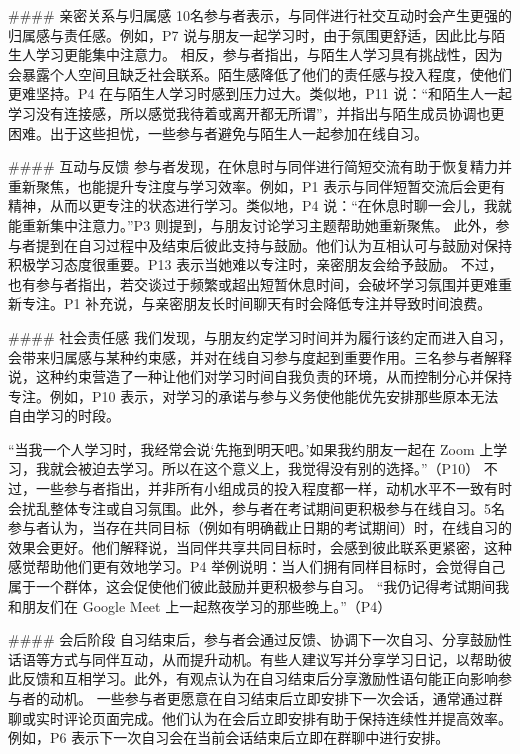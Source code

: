 \documentclass[12pt]{ctexart}
\begin{document}
\#\#\#\# 亲密关系与归属感
10名参与者表示，与同伴进行社交互动时会产生更强的归属感与责任感。例如，P7 说与朋友一起学习时，由于氛围更舒适，因此比与陌生人学习更能集中注意力。
相反，参与者指出，与陌生人学习具有挑战性，因为会暴露个人空间且缺乏社会联系。陌生感降低了他们的责任感与投入程度，使他们更难坚持。P4 在与陌生人学习时感到压力过大。类似地，P11 说：“和陌生人一起学习没有连接感，所以感觉我待着或离开都无所谓”，并指出与陌生成员协调也更困难。出于这些担忧，一些参与者避免与陌生人一起参加在线自习。

\#\#\#\# 互动与反馈
参与者发现，在休息时与同伴进行简短交流有助于恢复精力并重新聚焦，也能提升专注度与学习效率。例如，P1 表示与同伴短暂交流后会更有精神，从而以更专注的状态进行学习。类似地，P4 说：“在休息时聊一会儿，我就能重新集中注意力。”P3 则提到，与朋友讨论学习主题帮助她重新聚焦。
此外，参与者提到在自习过程中及结束后彼此支持与鼓励。他们认为互相认可与鼓励对保持积极学习态度很重要。P13 表示当她难以专注时，亲密朋友会给予鼓励。
不过，也有参与者指出，若交谈过于频繁或超出短暂休息时间，会破坏学习氛围并更难重新专注。P1 补充说，与亲密朋友长时间聊天有时会降低专注并导致时间浪费。

\#\#\#\# 社会责任感
我们发现，与朋友约定学习时间并为履行该约定而进入自习，会带来归属感与某种约束感，并对在线自习参与度起到重要作用。三名参与者解释说，这种约束营造了一种让他们对学习时间自我负责的环境，从而控制分心并保持专注。例如，P10 表示，对学习的承诺与参与义务使他能优先安排那些原本无法自由学习的时段。

“当我一个人学习时，我经常会说‘先拖到明天吧。’如果我约朋友一起在 Zoom 上学习，我就会被迫去学习。所以在这个意义上，我觉得没有别的选择。”（P10）
不过，一些参与者指出，并非所有小组成员的投入程度都一样，动机水平不一致有时会扰乱整体专注或自习氛围。此外，参与者在考试期间更积极参与在线自习。5名参与者认为，当存在共同目标（例如有明确截止日期的考试期间）时，在线自习的效果会更好。他们解释说，当同伴共享共同目标时，会感到彼此联系更紧密，这种感觉帮助他们更有效地学习。P4 举例说明：当人们拥有同样目标时，会觉得自己属于一个群体，这会促使他们彼此鼓励并更积极参与自习。
“我仍记得考试期间我和朋友们在 Google Meet 上一起熬夜学习的那些晚上。”（P4）

\#\#\#\# 会后阶段
自习结束后，参与者会通过反馈、协调下一次自习、分享鼓励性话语等方式与同伴互动，从而提升动机。有些人建议写并分享学习日记，以帮助彼此反馈和互相学习。此外，有观点认为在自习结束后分享激励性语句能正向影响参与者的动机。
一些参与者更愿意在自习结束后立即安排下一次会话，通常通过群聊或实时评论页面完成。他们认为在会后立即安排有助于保持连续性并提高效率。例如，P6 表示下一次自习会在当前会话结束后立即在群聊中进行安排。
\end{document}
